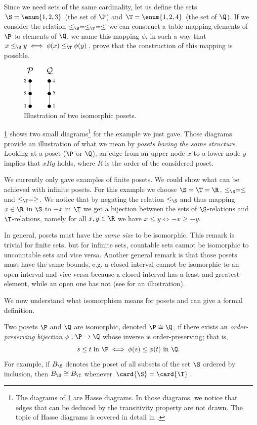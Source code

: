 Since we need sets of the same cardinality, let us define the sets $\S = \enum{1, 2,
3}$ (the set of $\P$) and $\T = \enum{1, 2, 4}$ (the set of $\Q$). If we consider
the relation $\le_{\S} = \le_{\T} = \le$ we can construct a table mapping elements of
$\P$ to elements of $\Q$, we name this mapping $\phi$, in such a way that $x
\le_{\S} y \iff \phi(x) \le_{\T} \phi(y)$. 
prove that the construction of this mapping is possible.

\begin{figure}
	\centering
	\includegraphics[width=0.15\textwidth]{fig/poset/iso/a}
	\caption{Illustration of two isomorphic posets.}
	\label{fig:poset:iso:a}
\end{figure}

\ref{fig:poset:iso:a} shows two small
diagrams\footnote{The diagrams of \ref{fig:poset:iso:a} are Hasse diagrams. In those diagrams, we
notice that edges that can be deduced by the transitivity property are not
drawn. The topic of Hasse diagrams is covered in detail in
.}
for the example we just gave.
Those diagrams provide an illustration of what we mean by \emph{posets having
the same structure}. Looking at a poset ($\P$ or $\Q$), an edge from an upper
node $x$ to a lower node $y$ implies that $x R y$ holds, where $R$ is the order
of the considered poset.

We currently only gave examples of finite posets. We could show what can be
achieved with infinite posets. For this example we choose $\S = \T = \R$,
$\le_{\S} = \le$ and $\le_{\T} = \ge$. We notice that by negating the relation
$\le_{\S}$ and thus mapping $x \in \R$ in $\S$ to $-x$ in $\T$ we get a
bijection between the sets of $\S$-relations and $\T$-relations, namely for all
$x, y \in \R$ we have $x \le y \iff -x \ge -y$.

In general, posets must have the \emph{same size} to be isomorphic. This remark
is trivial for finite sets, but for infinite sets, countable sets cannot be
isomorphic to uncountable sets and vice versa. Another general remark is that
those posets must have the same bounds, e.g. a closed interval cannot be
isomorphic to an open interval and vice versa because a closed interval has a
least and greatest element, while an open one has not (see
 for an illustration).

We now understand what isomorphism means for posets and can give a formal
definition.
\begin{definition}
Two posets $\P$ and $\Q$ are isomorphic, denoted $\P \cong \Q$, if
there exists an \emph{order-preserving bijection} $\phi : \P \to \Q$ whose
inverse is order-preserving; that is, $$s \leq t~\text{in}~\P \iff \phi(s) \leq
\phi(t)~\text{in}~\Q.$$ For example, if $B_{\S}$ denotes the poset of all subsets
of the set $\S$ ordered by inclusion, then $B_{\S} \cong B_{\T}$ whenever $\card{\S} =
\card{\T}$.
\end{definition}
